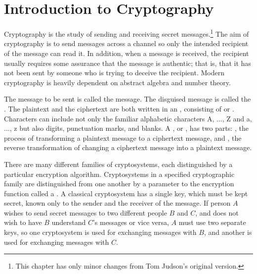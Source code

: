 \chapter{Introduction to Cryptography}\label{crypt}

Cryptography is the study of sending and receiving secret messages.\footnote{This chapter has only minor changes from Tom Judson's original version.}
The aim of cryptography is to send messages across a channel so only
the intended recipient of the message can read it. In addition, when a
message is received, the recipient usually requires some assurance that
the message is authentic; that is, that it has not been sent by
someone who is trying to deceive the recipient. Modern cryptography is
heavily dependent on abstract algebra and number theory. 
 
 
The message to be sent is called the  message. The disguised message is called
the . The plaintext and the
ciphertext are both written in an , consisting of  or . Characters can include not only the
familiar alphabetic characters A, $\ldots$, Z and a, $\ldots$, z but
also digits, punctuation marks, and blanks. A , or ,  has two parts: , the process
of transforming a plaintext message to a ciphertext message, and , the reverse transformation of changing a ciphertext
message into a plaintext message.
 
 
There are many different families of cryptosystems, each distinguished
by a particular encryption algorithm. Cryptosystems in a specified
cryptographic family are distinguished from one another by a parameter
to the encryption function called a . A classical cryptosystem has a single key, which must be kept
secret,  known only to the sender and the receiver of the message. If
person $A$ wishes to send secret messages to two different people $B$
and $C$, and does not wish to have $B$ understand $C$'s messages or
vice versa, $A$ must use two separate keys, so one cryptosystem is
used for exchanging messages with $B$, and another is used for
exchanging messages with $C$.
 
